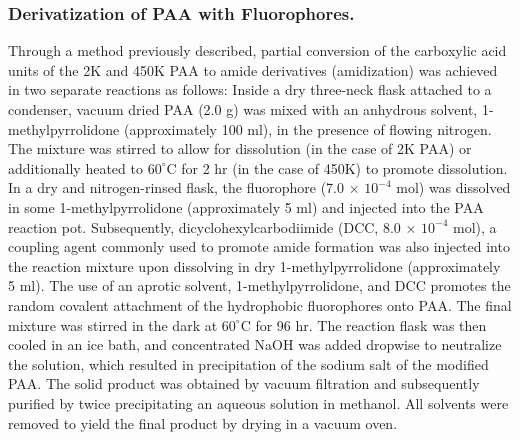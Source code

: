 \documentclass[twoside,twocolumn,9pt]{article}
\begin{document}
\subsubsection{Derivatization of PAA with Fluorophores.}    %
    \label{sec-derivPAA}

Through a method previously described, \cite{weber1954fluorescent,Anghel1998} partial conversion of the carboxylic acid units of the 2K and 450K PAA to amide derivatives (amidization) was achieved in two separate reactions as follows:  Inside a dry three-neck flask attached to a condenser, vacuum dried PAA (2.0 g) was mixed with an anhydrous solvent, 1-methylpyrrolidone (approximately 100 ml), in the presence of flowing nitrogen.  The mixture was stirred to allow for dissolution (in the case of 2K PAA) or additionally heated to $60^{\circ}$C for 2 hr (in the case of 450K) to promote dissolution.  In a dry and nitrogen-rinsed flask, the fluorophore (7.0 $\times$ $10^{-4}$ mol) was dissolved in some 1-methylpyrrolidone (approximately 5 ml) and injected into the PAA reaction pot.  Subsequently, dicyclohexylcarbodiimide (DCC, 8.0 $\times$ $10^{-4}$ mol), a coupling agent commonly used to promote amide formation was also injected into the reaction mixture upon dissolving in dry 1-methylpyrrolidone (approximately 5 ml).  The use of an aprotic solvent, 1-methylpyrrolidone, and DCC promotes the random covalent attachment of the hydrophobic fluorophores onto PAA.\cite{Anghel1998}  The final mixture was stirred in the dark at $60^{\circ}$C for 96 hr.  The reaction flask was then cooled in an ice bath, and concentrated NaOH was added dropwise to neutralize the solution, which resulted in precipitation of the sodium salt of the modified PAA.  The solid product was obtained by vacuum filtration and subsequently purified by twice precipitating an aqueous solution in methanol.  All solvents were removed to yield the final product by drying in a vacuum oven.
\end{document}
